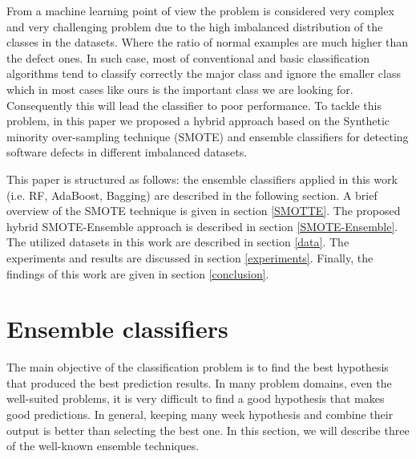 \documentclass[runningheads,a4paper]{llncs}
\begin{document}


 
 From a machine learning point of view the problem is considered very complex and very challenging problem due to the high imbalanced distribution of the classes in the datasets. Where the ratio of normal examples are much higher than the defect ones. In such case, most of conventional and basic classification algorithms tend to classify correctly the major class and ignore the smaller class which in most cases like ours is the important class we are looking for. Consequently this will lead the classifier to poor performance. To tackle this problem, in this paper we proposed a hybrid approach based on the Synthetic minority over-sampling technique (SMOTE) and ensemble classifiers for detecting software defects in different imbalanced datasets.
 

This paper is structured as follows: the ensemble classifiers applied in this work (i.e. RF, AdaBoost, Bagging) are described in the following section. A brief overview of the SMOTE technique is given in section \ref{SMOTTE}. The proposed hybrid SMOTE-Ensemble approach is described in section \ref{SMOTE-Ensemble}. The utilized datasets in this work are described in section \ref{data}. The experiments and results are discussed in section \ref{experiments}. Finally, the findings of this work are given in section \ref{conclusion}.






\section{Ensemble classifiers}
\label{ensembles}
The main objective of the classification problem is to find the best hypothesis that produced the best prediction results. In many problem domains, even the well-suited problems, it is very difficult to find a good hypothesis that makes good predictions. In general, keeping many week hypothesis and combine their output is better than selecting the best one.
In this section, we will describe three of the well-known ensemble techniques.
\end{document}
